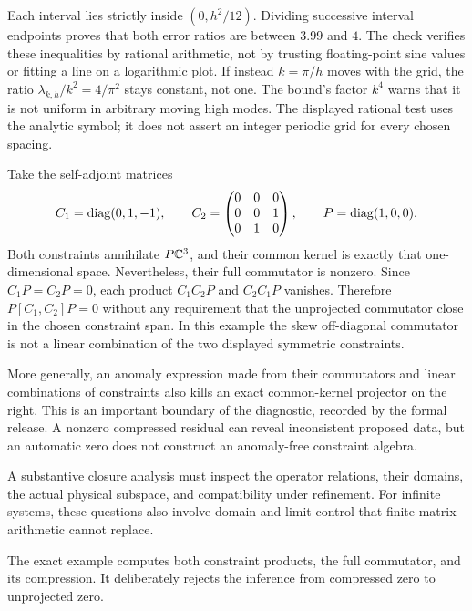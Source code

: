 Each interval lies strictly inside $(0,h^2/12)$. Dividing successive interval endpoints proves that both error ratios are between $3.99$ and $4$. The check verifies these inequalities by rational arithmetic, not by trusting floating-point sine values or fitting a line on a logarithmic plot.
If instead $k=\pi/h$ moves with the grid, the ratio $\lambda_{k,h}/k^2=4/\pi^2$ stays constant, not one. The bound's factor $k^4$ warns that it is not uniform in arbitrary moving high modes. The displayed rational test uses the analytic symbol; it does not assert an integer periodic grid for every chosen spacing.

Take the self-adjoint matrices
\[
C_1=\operatorname{diag}(0,1,-1),\qquad
C_2=\begin{pmatrix}0&0&0\\0&0&1\\0&1&0\end{pmatrix},\qquad
P=\operatorname{diag}(1,0,0).
\]
Both constraints annihilate $P\mathbb C^3$, and their common kernel is exactly that one-dimensional space. Nevertheless, their full commutator is nonzero.
Since $C_1P=C_2P=0$, each product $C_1C_2P$ and $C_2C_1P$ vanishes. Therefore $P[C_1,C_2]P=0$ without any requirement that the unprojected commutator close in the chosen constraint span. In this example the skew off-diagonal commutator is not a linear combination of the two displayed symmetric constraints.

More generally, an anomaly expression made from their commutators and linear combinations of constraints also kills an exact common-kernel projector on the right. This is an important boundary of the diagnostic, recorded by the formal release. A nonzero compressed residual can reveal inconsistent proposed data, but an automatic zero does not construct an anomaly-free constraint algebra.

A substantive closure analysis must inspect the operator relations, their domains, the actual physical subspace, and compatibility under refinement. For infinite systems, these questions also involve domain and limit control that finite matrix arithmetic cannot replace.

The exact example computes both constraint products, the full commutator, and its compression. It deliberately rejects the inference from compressed zero to unprojected zero.

